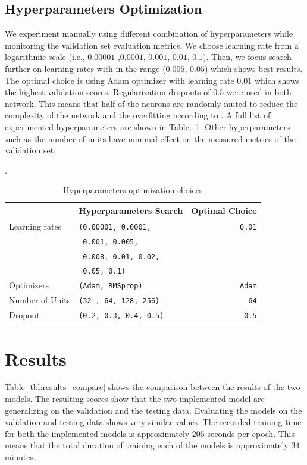 \documentclass[sigconf, nonacm, natbib, screen, balance=False]{acmart}
\begin{document}
\subsection{Hyperparameters Optimization}
We experiment manually using different combination of hyperparameters while monitoring the validation set evaluation metrics. We choose learning rate from a logarithmic scale (i.e., $0.00001$ ,$0.0001$, $0.001$, $0.01$, $0.1$). Then, we focus search further on learning rates with-in the range ($0.005$, $0.05$) which shows best results. The optimal choice is using Adam optimizer with learning rate $0.01$ which shows the highest validation scores. Regularization dropouts of $0.5$ were used in both network. This means that half of the neurons are randomly muted to reduce the complexity of the network and the overfitting according to \citep{dropout}. A full list of experimented hyperparameters are shown in Table.~\ref{tbl:hyperparameters}. Other hyperparameters such as the number of units have minimal effect on the measured metrics of the validation set.
\begin{table}. 
  \caption{Hyperparameters optimization choices}
  \label{tbl:hyperparameters}
  \begin{tabular}{l|l|r}  
    \hline
     & Hyperparameters Search &  Optimal Choice \\
    \hline
    Learning rates & \verb!(0.00001, 0.0001,! & \verb!0.01!\\
    & \verb! 0.001, 0.005,! \\
    & \verb! 0.008, 0.01, 0.02,! \\
    & \verb! 0.05, 0.1)! \\
    Optimizers & \verb!(Adam, RMSprop)! & \verb!Adam! \\
    Number of Units & \verb!(32 , 64, 128, 256)! & \verb!64! \\
    Dropout & \verb!(0.2, 0.3, 0.4, 0.5)! & \verb!0.5! \\\hline
  \end{tabular}
\end{table}

\section{Results}\label{sec:results}
Table \ref{tbl:results_compare} shows the comparison between the results of the two models. The resulting scores show that the two implemented model are generalizing on the validation and the testing data. Evaluating the models on the validation and testing data shows very similar values. The recorded training time for both the implemented models is approximately $205$ seconds per epoch. This means that the total duration of training each of the models is approximately $34$ minutes.   
\end{document}
